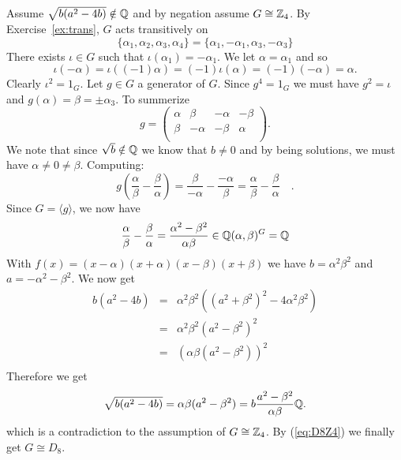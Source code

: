 \begin{myenumerate}
\begin{itemize}
  Assume \(\sqrt{b(a^2-4b)}\notin \mathbb{Q}\) and by negation
  assume \(G \cong \mathbb{Z}_4\).
  By Exercise~\ref{ex:trans}, $G$ acts transitively
  on
  \begin{equation*}
   \{\alpha_1, \alpha_2, \alpha_3, \alpha_4\} =
   \{\alpha_1, -\alpha_1, \alpha_3, -\alpha_3\}
  \end{equation*}
  There exists  \(\iota\in G\)  such that
  \(\iota(\alpha_1) = -\alpha_1\). We let \(\alpha=\alpha_1\) and so
  \begin{equation*}
  \iota(-\alpha) =
  \iota((-1)\alpha) =
  (-1)\iota(\alpha) =
  (-1)(-\alpha) = \alpha.
  \end{equation*}
  Clearly \(\iota^2= 1_{G}\).
  Let \(g\in G\) a generator of $G$. Since \(g^4=1_{G}\) we must have
  \(g^2 = \iota\) and \(g(\alpha) = \beta = \pm\alpha_3\).
  To summerize
  \begin{equation*}
   g = \left(\begin{array}{rrrr}
             \alpha &  \beta  & -\alpha & -\beta \\
             \beta  & -\alpha & -\beta  & \alpha \\
             \end{array}\right).
  \end{equation*}
  We note that since \(\sqrt{b}\notin \mathbb{Q}\) we know that \(b\neq 0\)
  and by being solutions, we must have \(\alpha \neq 0 \neq \beta\).
  Computing:
  \begin{equation*}
  g\left(\frac{\alpha}{\beta} - \frac{\beta}{\alpha}\right) =
  \frac{\beta}{-\alpha} - \frac{-\alpha}{\beta} =
  \frac{\alpha}{\beta} - \frac{\beta}{\alpha}\quad.
  \end{equation*}
  Since \(G = \langle g \rangle\), we now have
  \begin{equation*}
  \frac{\alpha}{\beta} - \frac{\beta}{\alpha}
  = \frac{\alpha^2 - \beta^2}{\alpha\beta} \in \mathbb{Q}(\alpha,\beta)^G = \mathbb{Q}
  \end{equation*}
  With \(f(x) = (x-\alpha)(x+\alpha)(x-\beta)(x+\beta)\)
  we have \(b = \alpha^2\beta^2\) and \(a = -\alpha^2 - \beta^2\).
  We now get
  \begin{eqnarray*}
  b(a^2 - 4b)
  &=&  \alpha^2\beta^2\left((a^2 + \beta^2)^2 - 4\alpha^2\beta^2\right) \\
  &=&  \alpha^2\beta^2(a^2 - \beta^2)^2 \\
  &=&  \left(\alpha\beta(a^2 - \beta^2)\right)^2 \\
  \end{eqnarray*}
  Therefore we get
  \begin{equation*}
  \sqrt{b(a^2 - 4b)}
     = \alpha\beta(a^2 - \beta^2)
     = b\frac{a^2 - \beta^2}{\alpha\beta} \mathbb{Q}.
  \end{equation*}
  which is a contradiction to the assumption of \(G \cong \mathbb{Z}_4\).
  By (\ref{eq:D8Z4}) we finally get \(G \cong D_8\).
\end{itemize}

\end{myenumerate}

